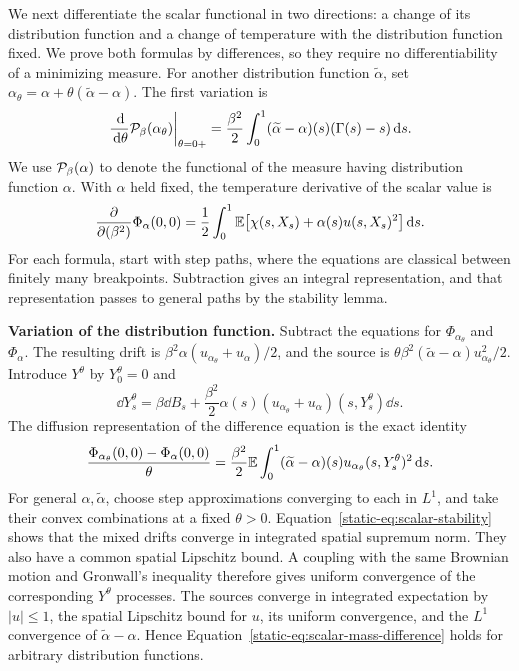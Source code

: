 We next differentiate the scalar functional in two directions: a
change of its distribution function and a change of temperature with
the distribution function fixed. We prove both formulas by differences,
so they require no differentiability of a minimizing measure.
For another distribution function $\widetilde\alpha$, set
$\alpha_\theta=\alpha+\theta(\widetilde\alpha-\alpha)$. The first
variation is
\begin{equation}\label{static-eq:scalar-mass-variation}
 \left.\frac{\,\mathrm d}{\,\mathrm d\theta}\mathcal P_\beta(\alpha_\theta)
       \right|_{\theta=0+}
 =\frac{\beta^2}{2}\int_0^1
       (\widetilde\alpha-\alpha)(s)(\Gamma(s)-s)\,\mathrm d s.
\end{equation}
We use $\mathcal P_\beta(\alpha)$ to denote the functional of the measure
having distribution function $\alpha$. With $\alpha$ held fixed,
the temperature derivative of the scalar value is
\begin{equation}\label{static-eq:scalar-temperature-variation}
 \frac{\partial}{\partial(\beta^2)}\Phi_\alpha(0,0)
 =\frac12\int_0^1
     \mathbb E\bigl[\chi(s,X_s)+\alpha(s)u(s,X_s)^2\bigr]\,\mathrm d s.
\end{equation}
For each formula, start with step paths, where the equations are
classical between finitely many breakpoints. Subtraction gives an
integral representation, and that representation passes to general
paths by the stability lemma.

\par\medskip\noindent\textbf{Variation of the distribution function.}\enspace
Subtract the equations for $\Phi_{\alpha_\theta}$ and $\Phi_\alpha$.
The resulting drift is
$\beta^2\alpha(u_{\alpha_\theta}+u_\alpha)/2$, and the source is
$\theta\beta^2(\widetilde\alpha-\alpha)u_{\alpha_\theta}^2/2$.
Introduce $Y^\theta$ by $Y^\theta_0=0$ and
\[
 \dd Y_s^\theta=\beta\dd B_s
 +\frac{\beta^2}{2}\alpha(s)
       (u_{\alpha_\theta}+u_\alpha)(s,Y_s^\theta)\dd s.
\]
The diffusion representation of the difference equation is the
exact identity
\begin{equation}\label{static-eq:scalar-mass-difference}
 \frac{\Phi_{\alpha_\theta}(0,0)-\Phi_\alpha(0,0)}{\theta}
 =\frac{\beta^2}{2}\mathbb E\int_0^1
       (\widetilde\alpha-\alpha)(s)
       u_{\alpha_\theta}(s,Y_s^\theta)^2\,\mathrm d s.
\end{equation}
For general $\alpha,\widetilde\alpha$, choose step approximations
converging to each in $L^1$, and take their convex combinations at
a fixed $\theta>0$. Equation~\eqref{static-eq:scalar-stability}
shows that the mixed drifts converge in integrated spatial supremum
norm. They also have a common spatial Lipschitz bound. A coupling
with the same Brownian motion and Gronwall's inequality therefore
gives uniform convergence of the corresponding $Y^\theta$
processes. The sources converge in integrated expectation by
$|u|\le1$, the spatial Lipschitz bound for $u$, its uniform
convergence, and the $L^1$ convergence of
$\widetilde\alpha-\alpha$. Hence
Equation~\eqref{static-eq:scalar-mass-difference} holds for arbitrary
distribution functions.

